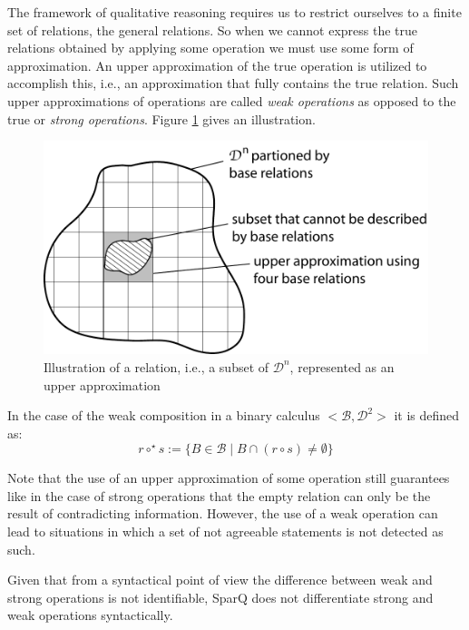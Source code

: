 \documentclass[headsepline]{scrreprt}
\theoremstyle{definition}
\newlength{\rest}
\newcommand{\engine}{SparQ}
\begin{document}
The framework of qualitative reasoning requires us to restrict ourselves to a finite set of relations, the general relations. So when we cannot express the true relations obtained by applying some operation we must use  some form of approximation.
An upper approximation of the true operation is utilized to accomplish this, i.e., an approximation that fully contains the true relation. Such upper approximations of operations are called {\em weak operations} as opposed to the true or {\em strong operations}. Figure \ref{FIG:weak-vs-strong} gives an illustration.

\begin{figure}
\centerline{\includegraphics[scale=.5]{weak_op}}
	\caption{\label{FIG:weak-vs-strong} Illustration of a relation, i.e., a subset of $\mathcal{D}^n$, represented as an upper approximation}
\end{figure}

In the case of the weak  composition in a binary calculus $<\mathcal{B},\mathcal{D}^2>$ it is defined as:
$$
r \circ^{\star} s := \{ B \in \mathcal{B}\; |\; B \cap (r \circ s) \neq \emptyset \}
$$

Note that the use of an upper approximation of some operation still guarantees like in the case of strong operations that the empty relation can only be the result of contradicting information. However, the use of a weak operation can lead to situations in which a set of not agreeable statements is not detected as such.

Given that from a syntactical point of view the difference between weak and strong operations is not identifiable, \engine{} does not differentiate strong and weak operations syntactically.



%
\end{document}
